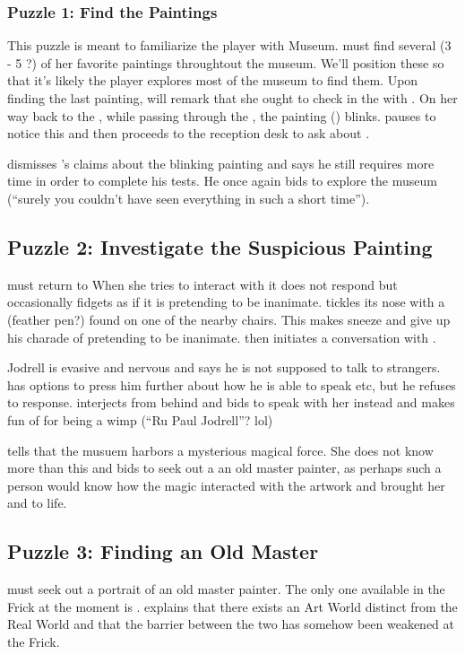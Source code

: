 \documentclass{article}
\begin{document}
\subsubsection{Puzzle 1: Find the Paintings}
This puzzle is meant to familiarize the player with Museum. \cyl{} must find several (3 - 5 ?) of her favorite paintings throughtout the museum. We'll position these so that it's likely the player explores most of the museum to find them. Upon finding the last painting, \cyl{} will remark that she ought to check in the with \ccurator{}. On her way back to the \rreception{}, while passing through the \rdining{}, the painting (\prpjodrell{}) blinks. \cyl{} pauses to notice this and then proceeds to the reception desk to ask about \ccurator{}.

\ccurator{} dismisses \cyl{}'s claims about the blinking painting and says he still requires more time in order to complete his tests. He once again bids \cyl{} to explore the museum (``surely you couldn't have seen everything in such a short time'').

\subsection{Puzzle 2: Investigate the Suspicious Painting}
\cyl{} must return to \prpjodrell{} When she tries to interact with it does not respond but occasionally fidgets as if it is pretending to be inanimate. \cyl{} tickles its nose with a \ifeather{} (feather pen?) found on one of the nearby chairs. This makes \prpjodrell{} sneeze and give up his charade of pretending to be inanimate. \prpjodrell{} then initiates a conversation with \cyl{}. 

Jodrell is evasive and nervous and says he is not supposed to talk to strangers. \cyl{} has options to press him further about how he is able to speak etc, but he refuses to response. \pdally interjects from behind and bids \cyl{} to speak with her instead and makes fun of \prpjodrell{} for being a wimp (``Ru Paul Jodrell''? lol)

\pdally tells \cyl{} that the musuem harbors a mysterious magical force. She does not know more than this and bids \cyl{} to seek out a an old master painter, as perhaps such a person would know how the magic interacted with the artwork and brought her and \prpjodrell{} to life.

\subsection{Puzzle 3: Finding an Old Master}
\cyl{} must seek out a portrait of an old master painter. The only one available in the Frick at the moment is \prembrandt{}. \prembrandt{} explains that there exists an Art World distinct from the Real World and that the barrier between the two has somehow been weakened at the Frick.
\end{document}
